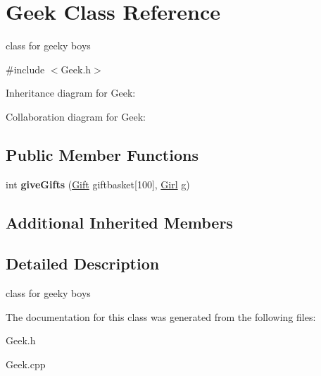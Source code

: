 \hypertarget{classGeek}{}\section{Geek Class Reference}
\label{classGeek}


class for geeky boys  




{\ttfamily \#include $<$Geek.\+h$>$}



Inheritance diagram for Geek\+:


Collaboration diagram for Geek\+:
\subsection*{Public Member Functions}
\begin{DoxyCompactItemize}
\item 
int {\bfseries give\+Gifts} (\hyperlink{classGift}{Gift} giftbasket\mbox{[}100\mbox{]}, \hyperlink{classGirl}{Girl} g)\hypertarget{classGeek_a968b91d2aca72aa15acfa7c8a5a3ce70}{}\label{classGeek_a968b91d2aca72aa15acfa7c8a5a3ce70}

\end{DoxyCompactItemize}
\subsection*{Additional Inherited Members}


\subsection{Detailed Description}
class for geeky boys 

The documentation for this class was generated from the following files\+:\begin{DoxyCompactItemize}
\item 
Geek.\+h\item 
Geek.\+cpp\end{DoxyCompactItemize}
